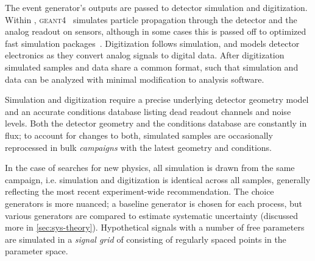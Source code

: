 The event generator's outputs are passed to detector simulation and digitization.
Within \atlas, \textsc{geant4}~\cite{geant} simulates particle propagation through the detector and the analog readout on sensors, although in some cases this is passed off to optimized fast simulation packages~\cite{atlfast}.
Digitization follows simulation, and models detector electronics as they convert analog signals to digital data.
After digitization simulated samples and data share a common format, such that simulation and data can be analyzed with minimal modification to analysis software.

Simulation and digitization require a precise underlying detector geometry model and an accurate conditions database listing dead readout channels and noise levels.
Both the detector geometry and the conditions database are constantly in flux; to account for changes to both, simulated samples are occasionally reprocessed in bulk \emph{campaigns} with the latest geometry and conditions.

In the case of searches for new physics, all simulation is drawn from the same campaign, i.e. simulation and digitization is identical across all samples, generally reflecting the most recent experiment-wide recommendation.
The choice generators is more nuanced; a baseline generator is chosen for each process, but various generators are compared to estimate systematic uncertainty (discussed more in \cref{sec:sys-theory}).
Hypothetical signals with a number of free parameters are simulated in a \emph{signal grid} of consisting of regularly spaced points in the parameter space.


